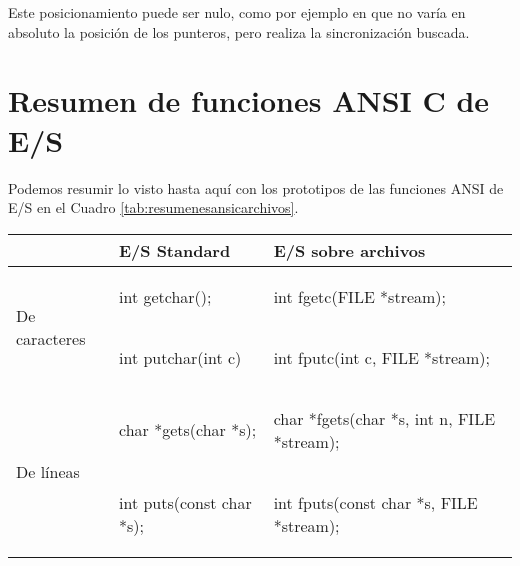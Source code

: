 Este posicionamiento puede ser nulo, como por ejemplo en 
que no varía en absoluto la posición de los punteros, pero realiza la
sincronización buscada.

\section{Resumen de funciones ANSI C de E/S}
Podemos resumir lo visto hasta aquí con los prototipos de las funciones ANSI de
E/S en el Cuadro \ref{tab:resumenesansicarchivos}.

\begin{table}[hbtp]
\centering
\begin{tabular}{l|l|l}
	\hline
			& E/S Standard			& E/S sobre archivos \\
    \hline
    \multirow{2}{*}{De caracteres}  & 
\begin{codecell}
int getchar();	
\end{codecell}
& 
\begin{codecell}
int fgetc(FILE *stream); 
\end{codecell}
\\
    								&
\begin{codecell}
int putchar(int c) 
\end{codecell}
& 
\begin{codecell}
int fputc(int c, FILE *stream); 
\end{codecell}
\\
    \hline
    \multirow{2}{*}{De líneas}  & 
\begin{codecell}
char *gets(char *s);
\end{codecell}
	& 
\begin{codecell}
char *fgets(char *s, 
int n, FILE *stream);
\end{codecell}
\\
    								&
\begin{codecell}
int puts(const char *s);
\end{codecell}
  & 
\begin{codecell}
int fputs(const char *s, 
FILE *stream);
\end{codecell}
 \\
    

\end{tabular}
\end{table}

